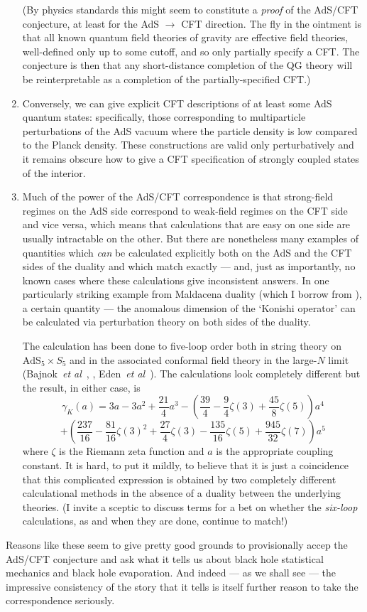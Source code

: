 \documentclass{article}
\newcommand{\be}{\begin{equation}}
\newcommand{\ee}{\end{equation}}
\newcommand{\AdS}{\mathrm{AdS}}
\begin{document}
\begin{enumerate}
(By physics standards this might seem to constitute a \emph{proof} of the AdS/CFT conjecture, at least for the AdS $\rightarrow$ CFT direction. The fly in the ointment is that all known quantum field theories of gravity are effective field theories, well-defined only up to some cutoff, and so only partially specify a CFT. The conjecture is then that any short-distance completion of the QG theory will be reinterpretable as a completion of the partially-specified CFT.)
\item Conversely, we can give explicit CFT descriptions of at least some AdS quantum states: specifically, those corresponding to multiparticle perturbations of the AdS vacuum where the particle density is low compared to the Planck density. These constructions are valid only perturbatively and it remains obscure how to give a CFT specification of strongly coupled states of the interior.
\item Much of the power of the AdS/CFT correspondence is that strong-field regimes on the AdS side correspond to weak-field regimes on the CFT side and vice versa, which means that calculations that are easy on one side are usually intractable on the other. But there are nonetheless many examples of quantities which \emph{can} be calculated explicitly both on the AdS and the CFT sides of the duality and which match exactly --- and, just as importantly, no known cases where these calculations give inconsistent answers. In one particularly striking example from Maldacena duality (which I borrow from ), a certain quantity --- the anomalous dimension of the `Konishi operator' can be calculated via perturbation theory on both sides of the duality. 

The calculation has been done to five-loop order both in string theory on $\AdS_5 \times S_5$ and in the associated conformal field theory in the large-$N$ limit (Bajnok~\emph{et al}~, , Eden~\emph{et al}~). The calculations look completely different but the result, in either case, is
\[
\gamma_K(a) = 3a - 3a^2 +\frac{21}{4}a^3 - \left( \frac{39}{4} - \frac{9}{4}\zeta(3) + \frac{45}{8}\zeta(5)\right)a^4\]
\be
+  \left(\frac{237}{16}- \frac{81 }{16}\zeta(3)^2 + \frac{27}{4} \zeta(3) - \frac{135}{16}  \zeta(5)+ \frac{945}{32} \zeta(7)  \right)a^5
\ee
where $\zeta$ is the Riemann zeta function and $a$ is the appropriate coupling constant. It is hard, to put it mildly, to believe that it is just a coincidence that this complicated expression is obtained by two completely different calculational methods in the absence of a duality between the underlying theories. (I invite a sceptic to discuss terms for a bet on whether the \emph{six-loop} calculations, as and when they are done, continue to match!)
\end{enumerate}
Reasons like these seem to give pretty good grounds to provisionally accep the AdS/CFT conjecture and ask what it tells us about black hole statistical mechanics and black hole evaporation. And indeed --- as we shall see --- the impressive consistency of the story that it tells is itself further reason to take the correspondence seriously.
\end{document}
